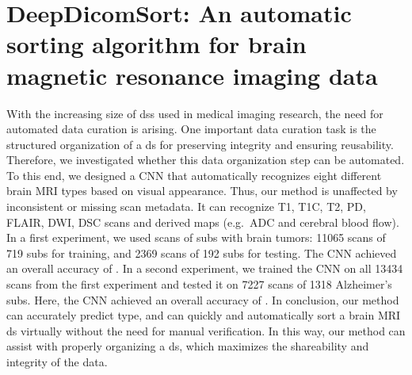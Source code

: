 
\chapter[DeepDicomSort: An automatic sorting algorithm for brain magnetic resonance imaging data][DeepDicomSort]{DeepDicomSort: An automatic sorting algorithm for brain magnetic resonance imaging data}\label{chap:DDS}

\begin{ChapterAbstract}
With the increasing size of \glspl{ds} used in medical imaging research, the need for automated data curation is arising.
One important data curation task is the structured organization of a \gls{ds} for preserving integrity and ensuring reusability.
Therefore, we investigated whether this data organization step can be automated.
To this end, we designed a \gls{CNN} that automatically recognizes eight different brain \gls{MRI} \glspl{type} based on visual appearance.
Thus, our method is unaffected by inconsistent or missing \gls{scan} metadata.
It can recognize \gls{T1}, \gls{T1C}, \gls{T2}, \gls{PD}, \gls{FLAIR}, \gls{DWI}, \gls{DSC} \glspl{scan} and derived maps (e.g.\ \acrlong{ADC} and cerebral blood flow).
In a first experiment, we used \glspl{scan} of \glspl{sub} with brain \glspl{tumor}: \num{11065} \glspl{scan} of \num{719} \glspl{sub} for training, and \num{2369} \glspl{scan} of \num{192} \glspl{sub} for testing.
The \gls{CNN} achieved an overall accuracy of .
In a second experiment, we trained the \gls{CNN} on all \num{13434} \glspl{scan} from the first experiment and tested it on \num{7227} \glspl{scan} of \num{1318} Alzheimer's \glspl{sub}.
Here, the \gls{CNN} achieved an overall accuracy of .
In conclusion, our method can accurately predict \gls{type}, and can quickly and automatically sort a brain \gls{MRI} \gls{ds} virtually without the need for manual verification.
In this way, our method can assist with properly organizing a \gls{ds}, which maximizes the shareability and integrity of the data.

\end{ChapterAbstract}
\setcellgapes{5pt}


